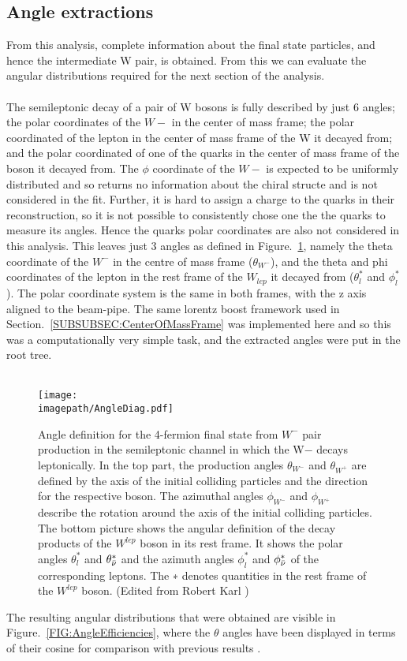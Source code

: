 \subsection{Angle extractions}
\label{SUBSEC:AngleExtractions}
From this analysis, complete information about the final state particles, and hence the intermediate W pair, is obtained. From this we can evaluate the angular distributions required for the next section of the analysis.
\\\\
The semileptonic decay of a pair of W bosons is fully described by just 6 angles; the polar coordinates of the ${W}{-}$ in the center of mass frame; the polar coordinated of the lepton in the center of mass frame of the W it decayed from; and the polar coordinated of one of the quarks in the center of mass frame of the boson it decayed from. The $\phi$ coordinate of the ${W}{-}$ is expected to be uniformly distributed and so returns no information about the chiral structe and is not considered in the fit. Further, it is hard to assign a charge to the quarks in their reconstruction, so it is not possible to consistently chose one the the quarks to measure its angles. Hence the quarks polar coordinates are also not considered in this analysis. This leaves just 3 angles as defined in Figure.~\ref{FIG:Angles}, namely the theta coordinate of the ${W}^{-}$ in the centre of mass frame (${\theta}_{{W}^{-}}$), and the theta and phi coordinates of the lepton in the rest frame of the ${W}_{lep}$ it decayed from (${\theta}_{l}^{*}$ and ${\phi}_{l}^{*}$). The polar coordinate system is the same in both frames, with the z axis aligned to the beam-pipe. The same lorentz boost framework used in Section.~\ref{SUBSUBSEC:CenterOfMassFrame} was implemented here and so this was a computationally very simple task, and the extracted angles were put in the root tree.
\\\\
\begin{figure}
    \texttt{[image: \\imagepath/AngleDiag.pdf]}
    \caption{
    Angle definition for the 4-fermion final state from ${W}^{-}$ pair production in the semileptonic channel in which the W− decays leptonically. In the top part, the production angles ${\theta}_{{W}^{-}}$ and ${\theta}_{{W}^{+}}$ are defined by the axis of the initial colliding particles and the direction for the respective boson. The azimuthal angles ${\phi}_{{W}^{-}}$ and ${\phi}_{{W}^{+}}$ describe the rotation around the axis of the initial colliding particles.\\
    The bottom picture shows the angular definition of the decay products of the ${W}^{lep}$ boson in its rest frame. It shows the polar angles ${\theta}_{l}^{*}$ and ${\theta}_{\bar{\nu}}^{*}$ and the azimuth angles ${\phi}_{l}^{*}$ and ${\phi}_{\bar{\nu}}^{*}$ of the corresponding leptons. The ∗ denotes quantities in the rest frame of the ${W}^{lep}$ boson. (Edited from Robert Karl \cite{RobertKarl})
      }
    \label{FIG:Angles}
\end{figure}
The resulting angular distributions that were obtained are visible in Figure.~\ref{FIG:AngleEfficiencies}, where the $\theta$ angles have been displayed in terms of their cosine for comparison with previous results \cite{RobertKarl}.

